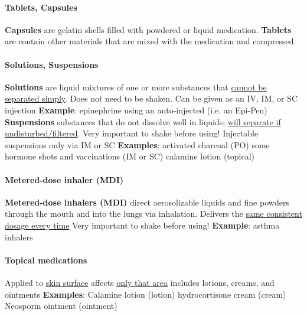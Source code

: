\documentclass[../../EMT-169.tex]{subfiles}
\begin{document}
\paragraph{Tablets, Capsules}
\begin{outline}	
	\1[] \textbf{Capsules} are gelatin shells filled with powdered or liquid medication.
	\1[] \textbf{Tablets} are contain other materials that are mixed with the medication and compressed.
\end{outline}	

\paragraph{Solutions, Suspensions}
\begin{outline}
	\1[] \textbf{Solutions} are liquid mixtures of one or more substances that \underline{cannot be separated simply}.
		\2[] Does not need to be shaken.  Can be given as an IV, IM, or SC injection
		\2[] \textbf{Example}: 
			\3[] epinephrine using an auto-injected (i.e. an Epi-Pen) \newline
	\1[] \textbf{Suspensions} substances that do not dissolve well in liquids; \underline{will separate if undisturbed/filtered}.
		\2[] Very important to shake before using!
		\2[] Injectable suspensions only via IM or SC
	\2[] \textbf{Examples}:
		\3[] activated charcoal (PO)
		\3[] some hormone shots and vaccinations (IM or SC)
		\3[] calamine lotion (topical)
\end{outline}

\paragraph{Metered-dose inhaler (MDI)}
\begin{outline}
	\1[] \textbf{Metered-dose inhalers (MDI)} direct aerosolizable liquids and fine powders through the mouth and into the lungs via inhalation.
		\2[] Delivers the \underline{same consistent dosage every time}	
		\2[] Very important to shake before using!
		\2[] \textbf{Example}:
			\3[] asthma inhalers
\end{outline}


\paragraph{Topical medications}
\begin{outline}
	\1[] Applied to \underline{skin surface}
	\1[] affects \underline{only that area}
	\1[] includes lotions, creams, and ointments
	\1[] \textbf{Examples}:
		\2[] Calamine lotion (lotion) 
		\2[] hydrocortisone cream (cream) 
		\2[] Neosporin ointment (ointment) 
\end{outline}
\end{document}
